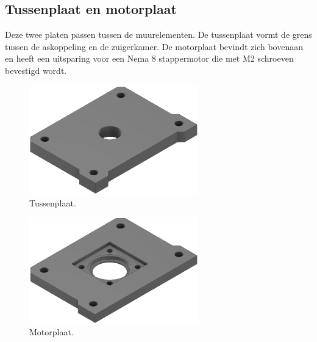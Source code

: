 \subsection{Tussenplaat en motorplaat}
Deze twee platen passen tussen de muurelementen. De tussenplaat vormt de grens tussen de askoppeling en de zuigerkamer. De motorplaat bevindt zich bovenaan en heeft een uitsparing voor een Nema 8 stappermotor die met M2 schroeven bevestigd wordt. 
\\[12pt]\begin{minipage}[t]{0.49\textwidth}
    \vspace{0pt}
    \begin{figure}[H]
        \centering
        \includegraphics[width=0.65\textwidth]{figures/Topp_Wall_w.png}
        \caption{Tussenplaat.}\label{fig:tussenplaat}
    \end{figure}
\end{minipage}
\begin{minipage}[t]{0.49\textwidth}
    \vspace{0pt}
    \begin{figure}[H]
        \centering
        \includegraphics[width=0.65\textwidth]{figures/motor_mount_wide.png}
        \caption{Motorplaat.}\label{fig:motorplaat}
    \end{figure}
\end{minipage}\\

